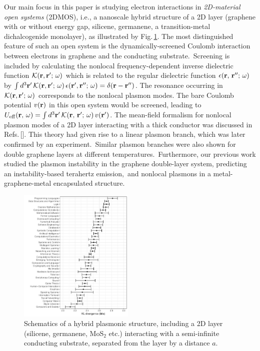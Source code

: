 \documentclass[aps,prb,showpacs]{revtex4}
\newcommand{\mc}{\mathcal}
\begin{document}
Our main focus in this paper is studying electron interactions in \textit{2D-material open systems} (2DMOS), i.e., a nanoscale hybrid structure of a 2D
layer (graphene with or without energy gap, silicene, germanene, a transition-metal dichalcogenide monolayer), as illustrated by Fig.\,\ref{FIG:1}. The most distinguished feature of 
such an open system is the dynamically-screened Coulomb interaction between electrons in graphene and the conducting substrate.\,\cite{ourPRB15} 
Screening is included by calculating the nonlocal frequency-dependent inverse dielectric function $\mc{K}({\bf r},{\bf r}';\,\omega)$ which is related to the regular
dielectric function $\epsilon({\bf r},\,{\bf r''};\,\omega)$ by $\int d^3{\bf r'}\, \mc{K}({\bf r},{\bf r'};\, \omega)\,\epsilon({\bf r'},{\bf r''};\,\omega)
=\delta({\bf r} - {\bf r''})$. The resonance occurring in $\mc{K}({\bf r},{\bf r}';\,\omega)$ corresponds to the nonlocal plasmon modes. 
The bare Coulomb potential $v({\bf r})$ in this open system would be screened, leading to 
$U_{\rm eff}({\bf r},\,\omega) = \int d^3{\bf r'}\,\mc{K}({\bf r},\, {\bf r'};\,\omega)\,v({\bf r'})$.
The mean-field formalism for nonlocal plasmon modes of a 2D layer interacting with a thick conductor
was discussed in Refs.\,[]. This theory had given rise to a linear plasmon 
branch, which was later confirmed by an experiment.\,\cite{kram} Similar plasmon branches were also shown for 
double graphene layers at different temperatures.\,\cite{ourPRB15,coherent,myT,hbook,ourSREP} Furthermore, our previous work
studied the plasmon instability in the graphene double-layer system, predicting an instability-based terahertz emission,\,\cite{spiler} 
and nonlocal plasmons in a metal-graphene-metal encapsulated structure.\,\cite{gsandw}
\medskip

\begin{figure}
\centering
\includegraphics[width=0.49\textwidth]{FIG1}
\caption{Schematics of a hybrid plasmonic structure, including a 2D layer (silicene, 
germanene, MoS$_2$ etc.) interacting with a semi-infinite conducting substrate, separated from the layer by a distance $a$.}
\label{FIG:1}
\end{figure}
\end{document}
